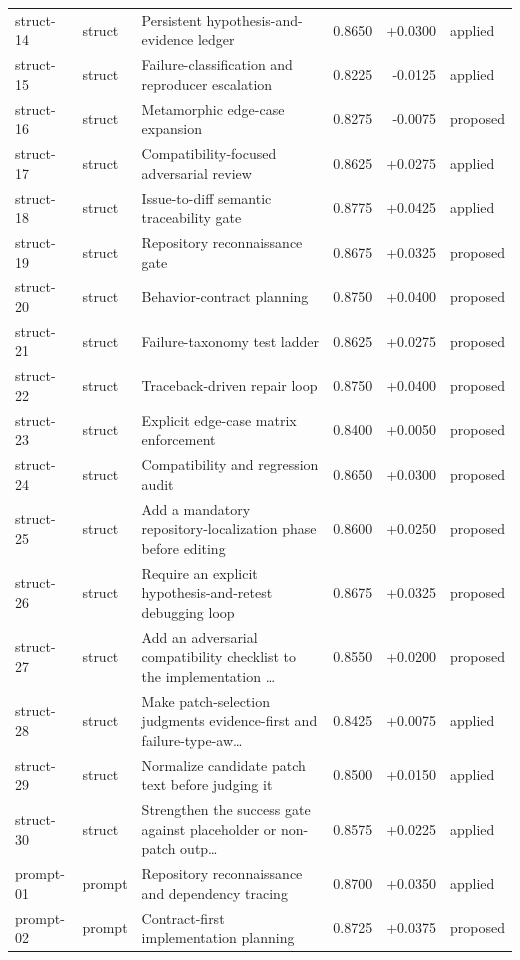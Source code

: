\begin{center}
\begin{longtable}{llp{5.2cm}rrl}
struct-14 & struct & Persistent hypothesis-and-evidence ledger & 0.8650 & +0.0300 & applied \\
struct-15 & struct & Failure-classification and reproducer escalation & 0.8225 & -0.0125 & applied \\
struct-16 & struct & Metamorphic edge-case expansion & 0.8275 & -0.0075 & proposed \\
struct-17 & struct & Compatibility-focused adversarial review & 0.8625 & +0.0275 & applied \\
struct-18 & struct & Issue-to-diff semantic traceability gate & 0.8775 & +0.0425 & applied \\
struct-19 & struct & Repository reconnaissance gate & 0.8675 & +0.0325 & proposed \\
struct-20 & struct & Behavior-contract planning & 0.8750 & +0.0400 & proposed \\
struct-21 & struct & Failure-taxonomy test ladder & 0.8625 & +0.0275 & proposed \\
struct-22 & struct & Traceback-driven repair loop & 0.8750 & +0.0400 & proposed \\
struct-23 & struct & Explicit edge-case matrix enforcement & 0.8400 & +0.0050 & proposed \\
struct-24 & struct & Compatibility and regression audit & 0.8650 & +0.0300 & proposed \\
struct-25 & struct & Add a mandatory repository-localization phase before editing & 0.8600 & +0.0250 & proposed \\
struct-26 & struct & Require an explicit hypothesis-and-retest debugging loop & 0.8675 & +0.0325 & proposed \\
struct-27 & struct & Add an adversarial compatibility checklist to the implementation \ldots{} & 0.8550 & +0.0200 & proposed \\
struct-28 & struct & Make patch-selection judgments evidence-first and failure-type-aw\ldots{} & 0.8425 & +0.0075 & applied \\
struct-29 & struct & Normalize candidate patch text before judging it & 0.8500 & +0.0150 & applied \\
struct-30 & struct & Strengthen the success gate against placeholder or non-patch outp\ldots{} & 0.8575 & +0.0225 & applied \\
prompt-01 & prompt & Repository reconnaissance and dependency tracing & 0.8700 & +0.0350 & applied \\
prompt-02 & prompt & Contract-first implementation planning & 0.8725 & +0.0375 & proposed \\

\end{longtable}
\end{center}
